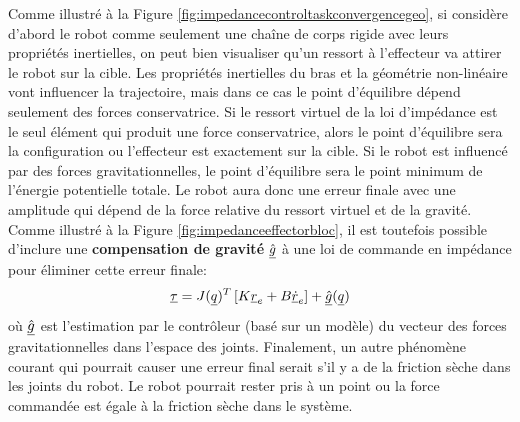Comme illustré à la Figure \ref{fig:impedancecontroltaskconvergencegeo}, si considère d'abord le robot comme seulement une chaîne de corps rigide avec leurs propriétés inertielles, on peut bien visualiser qu'un ressort à l'effecteur va attirer le robot sur la cible. Les propriétés inertielles du bras et la géométrie non-linéaire vont influencer la trajectoire, mais dans ce cas le point d'équilibre dépend seulement des forces conservatrice. Si le ressort virtuel de la loi d'impédance est le seul élément qui produit une force conservatrice, alors le point d'équilibre sera la configuration ou l'effecteur est exactement sur la cible. Si le robot est influencé par des forces gravitationnelles, le point d'équilibre sera le point minimum de l'énergie potentielle totale. Le robot aura donc une erreur finale avec une amplitude qui dépend de la force relative du ressort virtuel et de la gravité. Comme illustré à la Figure \ref{fig:impedanceeffectorbloc}, il est toutefois possible d'inclure une \textbf{compensation de gravité} $\underline{\hat{g}}$ à une loi de commande en impédance pour éliminer cette erreur finale:
\begin{align}
\underline{\tau} = J(\underline{q})^T   \left[ K \underline{r}_e + B \underline{\dot{r}}_e \right] + \underline{\hat{g}}(\underline{q})
\end{align} 
où $\underline{\hat{g}}$ est l'estimation par le contrôleur (basé sur un modèle) du vecteur des forces gravitationnelles dans l'espace des joints. Finalement, un autre phénomène courant qui pourrait causer une erreur final serait s'il y a de la friction sèche dans les joints du robot. Le robot pourrait rester pris à un point ou la force commandée est égale à la friction sèche dans le système.


